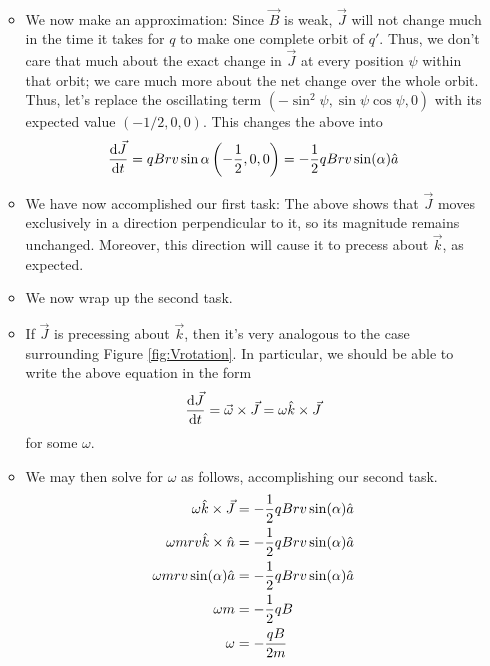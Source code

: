 \documentclass[../notes.tex]{subfiles}
\begin{document}
\begin{itemize}
\begin{itemize}
\begin{align*}
        \end{align*}
        \item We now make an approximation: Since $\vec{B}$ is weak, $\vec{J}$ will not change much in the time it takes for $q$ to make one complete orbit of $q'$. Thus, we don't care that much about the exact change in $\vec{J}$ at every position $\psi$ within that orbit; we care much more about the net change over the whole orbit. Thus, let's replace the oscillating term $(-\sin^2\psi,\sin\psi\cos\psi,0)$ with its expected value $(-1/2,0,0)$. This changes the above into
        \begin{equation*}
            \dv{\vec{J}}{t} = qBrv\sin\alpha\left( -\frac{1}{2},0,0 \right)
            = -\frac{1}{2}qBrv\sin(\alpha)\hat{a}
        \end{equation*}
        \item We have now accomplished our first task: The above shows that $\vec{J}$ moves exclusively in a direction perpendicular to it, so its magnitude remains unchanged. Moreover, this direction will cause it to precess about $\vec{k}$, as expected.
        \item We now wrap up the second task.
        \item If $\vec{J}$ is precessing about $\vec{k}$, then it's very analogous to the case surrounding Figure \ref{fig:Vrotation}. In particular, we should be able to write the above equation in the form
        \begin{equation*}
            \dv{\vec{J}}{t} = \vec{\omega}\times\vec{J}
            = \omega\hat{k}\times\vec{J}
        \end{equation*}
        for some $\omega$.
        \item We may then solve for $\omega$ as follows, accomplishing our second task.
        \begin{align*}
            \omega\hat{k}\times\vec{J} &= -\frac{1}{2}qBrv\sin(\alpha)\hat{a}\\
            \omega mrv\hat{k}\times\hat{n} &= -\frac{1}{2}qBrv\sin(\alpha)\hat{a}\\
            \omega mrv\sin(\alpha)\hat{a} &= -\frac{1}{2}qBrv\sin(\alpha)\hat{a}\\
            \omega m &= -\frac{1}{2}qB\\
            \omega &= -\frac{qB}{2m}
        \end{align*}
    \end{itemize}
\end{itemize}
\end{document}
